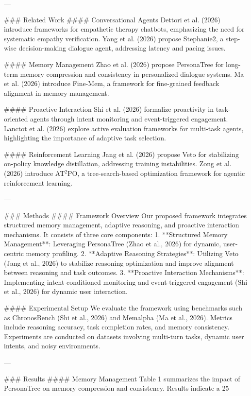 ---

### Related Work  
#### Conversational Agents  
Dettori et al. (2026) introduce frameworks for empathetic therapy chatbots, emphasizing the need for systematic empathy verification. Yang et al. (2026) propose Stephanie2, a step-wise decision-making dialogue agent, addressing latency and pacing issues.

#### Memory Management  
Zhao et al. (2026) propose PersonaTree for long-term memory compression and consistency in personalized dialogue systems. Ma et al. (2026) introduce Fine-Mem, a framework for fine-grained feedback alignment in memory management.

#### Proactive Interaction  
Shi et al. (2026) formalize proactivity in task-oriented agents through intent monitoring and event-triggered engagement. Lanctot et al. (2026) explore active evaluation frameworks for multi-task agents, highlighting the importance of adaptive task selection.

#### Reinforcement Learning  
Jang et al. (2026) propose Veto for stabilizing on-policy knowledge distillation, addressing training instabilities. Zong et al. (2026) introduce AT$^2$PO, a tree-search-based optimization framework for agentic reinforcement learning.

---

### Methods  
#### Framework Overview  
Our proposed framework integrates structured memory management, adaptive reasoning, and proactive interaction mechanisms. It consists of three core components:  
1. **Structured Memory Management**: Leveraging PersonaTree (Zhao et al., 2026) for dynamic, user-centric memory profiling.  
2. **Adaptive Reasoning Strategies**: Utilizing Veto (Jang et al., 2026) to stabilize reasoning optimization and improve alignment between reasoning and task outcomes.  
3. **Proactive Interaction Mechanisms**: Implementing intent-conditioned monitoring and event-triggered engagement (Shi et al., 2026) for dynamic user interaction.

#### Experimental Setup  
We evaluate the framework using benchmarks such as ChronosBench (Shi et al., 2026) and Memalpha (Ma et al., 2026). Metrics include reasoning accuracy, task completion rates, and memory consistency. Experiments are conducted on datasets involving multi-turn tasks, dynamic user intents, and noisy environments.

---

### Results  
#### Memory Management  
Table 1 summarizes the impact of PersonaTree on memory compression and consistency. Results indicate a 25%

